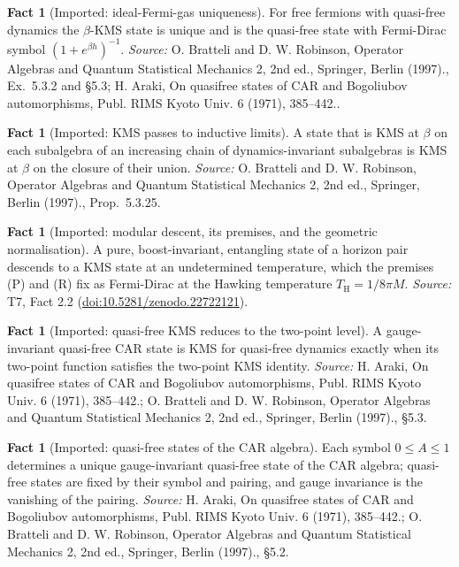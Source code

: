 \documentclass[11pt]{article}
\theoremstyle{definition}
\newtheorem{fact}[theorem]{Fact}
\theoremstyle{plain}
\providecommand{\TH}{}\renewcommand{\TH}{T_{\mathrm{H}}}
\begin{document}
\begin{fact}[Imported: ideal-Fermi-gas uniqueness]\label{c:hawking.imported-ideal-fermi-gas-uniqueness}
For free fermions with quasi-free dynamics the $\beta$-KMS state is unique and is the quasi-free state with Fermi-Dirac symbol $(1 + e^{\beta h})^{-1}$.
\emph{Source:} O. Bratteli and D. W. Robinson, Operator Algebras and Quantum Statistical Mechanics 2, 2nd ed., Springer, Berlin (1997)., Ex.~5.3.2 and \S 5.3; H. Araki, On quasifree states of CAR and Bogoliubov automorphisms, Publ. RIMS Kyoto Univ. 6 (1971), 385--442..
\end{fact}

\begin{fact}[Imported: KMS passes to inductive limits]\label{c:hawking.imported-kms-passes-inductive-limits}
A state that is KMS at $\beta$ on each subalgebra of an increasing chain of dynamics-invariant subalgebras is KMS at $\beta$ on the closure of their union.
\emph{Source:} O. Bratteli and D. W. Robinson, Operator Algebras and Quantum Statistical Mechanics 2, 2nd ed., Springer, Berlin (1997)., Prop.~5.3.25.
\end{fact}

\begin{fact}[Imported: modular descent, its premises, and the geometric normalisation]\label{c:hawking.imported-modular-descent-premises-geometric-normalisation}
A pure, boost-invariant, entangling state of a horizon pair descends to a KMS state at an undetermined temperature, which the premises (P) and (R) fix as Fermi-Dirac at the Hawking temperature $\TH = 1/8\pi M$.
\emph{Source:} T7, Fact 2.2 (\href{https://doi.org/10.5281/zenodo.22722121}{doi:10.5281/zenodo.22722121}).
\end{fact}

\begin{fact}[Imported: quasi-free KMS reduces to the two-point level]\label{c:hawking.imported-quasi-free-kms-reduces-two}
A gauge-invariant quasi-free CAR state is KMS for quasi-free dynamics exactly when its two-point function satisfies the two-point KMS identity.
\emph{Source:} H. Araki, On quasifree states of CAR and Bogoliubov automorphisms, Publ. RIMS Kyoto Univ. 6 (1971), 385--442.; O. Bratteli and D. W. Robinson, Operator Algebras and Quantum Statistical Mechanics 2, 2nd ed., Springer, Berlin (1997)., \S 5.3.
\end{fact}

\begin{fact}[Imported: quasi-free states of the CAR algebra]\label{c:hawking.imported-quasi-free-states-car-algebra}
Each symbol $0 \le A \le 1$ determines a unique gauge-invariant quasi-free state of the CAR algebra; quasi-free states are fixed by their symbol and pairing, and gauge invariance is the vanishing of the pairing.
\emph{Source:} H. Araki, On quasifree states of CAR and Bogoliubov automorphisms, Publ. RIMS Kyoto Univ. 6 (1971), 385--442.; O. Bratteli and D. W. Robinson, Operator Algebras and Quantum Statistical Mechanics 2, 2nd ed., Springer, Berlin (1997)., \S 5.2.
\end{fact}
\end{document}
